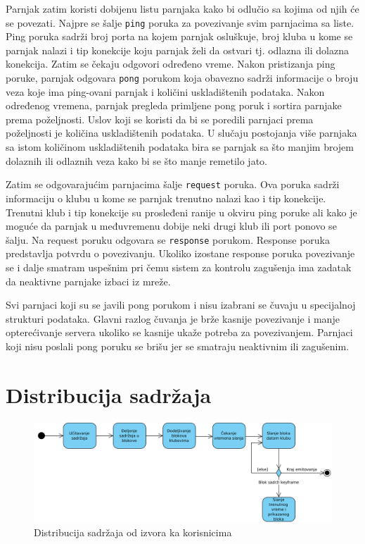 \documentclass[12pt,oneside]{memoir}
\begin{document}
Parnjak zatim koristi dobijenu listu parnjaka kako bi odlučio sa kojima od njih će se povezati. Najpre se šalje \texttt{ping} poruka za povezivanje svim parnjacima sa liste. Ping poruka sadrži broj porta na kojem parnjak osluškuje, broj kluba u kome se parnjak nalazi i tip konekcije koju parnjak želi da ostvari tj. odlazna ili dolazna konekcija. Zatim se čekaju odgovori određeno vreme. Nakon pristizanja ping poruke, parnjak odgovara \texttt{pong} porukom koja obavezno sadrži informacije o broju veza koje ima ping-ovani parnjak i količini uskladištenih podataka. Nakon određenog vremena, parnjak pregleda primljene pong poruk i sortira parnjake prema poželjnosti. Uslov koji se koristi da bi se poredili parnjaci prema poželjnosti je količina uskladištenih podataka. U slučaju postojanja više parnjaka sa istom količinom uskladištenih podataka bira se parnjak sa što manjim brojem dolaznih ili odlaznih veza kako bi se što manje remetilo jato.
 
Zatim se odgovarajućim parnjacima šalje \texttt{request} poruka. Ova poruka sadrži informaciju o klubu u kome se parnjak trenutno nalazi kao i tip konekcije. Trenutni klub i tip konekcije su prosleđeni ranije u okviru ping poruke ali kako je moguće da parnjak u međuvremenu dobije neki drugi klub ili port ponovo se šalju. Na request poruku odgovara se \texttt{response} porukom. Response poruka predstavlja potvrdu o povezivanju. Ukoliko izostane response poruka povezivanje se i dalje smatram uspešnim pri čemu sistem za kontrolu zagušenja ima zadatak da neaktivne parnjake izbaci iz mreže. 

Svi parnjaci koji su se javili pong porukom i nisu izabrani se čuvaju u specijalnoj strukturi podataka. Glavni razlog čuvanja je brže kasnije povezivanje i manje opterećivanje servera ukoliko se kasnije ukaže potreba za povezivanjem. Parnjaci koji nisu poslali pong poruku se brišu jer se smatraju neaktivnim ili zagušenim.  


\section{Distribucija sadržaja}
\label{Kikkar.3}

\begin{figure}[!ht]
  \centering
  \includegraphics[width=1.05\textwidth]{slike/distribucija-izvor.jpg}
  \caption{Distribucija sadržaja od izvora ka korisnicima}
  \label{fig:distribucija-izvor}
\end{figure}
\par
\end{document}
